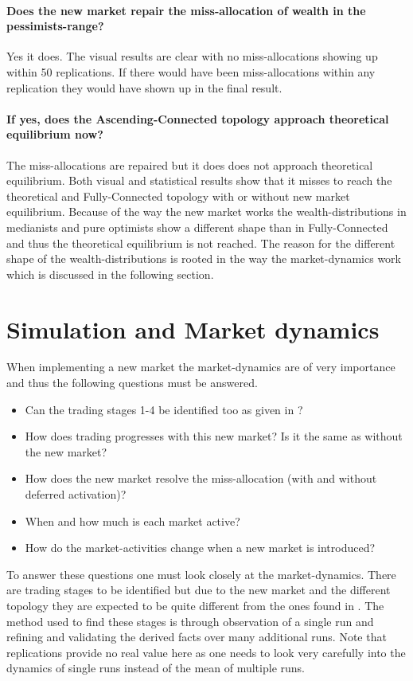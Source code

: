 \documentclass[Bachelorarbeit.tex]{subfiles}
\begin{document}
\paragraph{Does the new market repair the miss-allocation of wealth in the pessimists-range?}
Yes it does. The visual results are clear with no miss-allocations showing up within 50 replications. If there would have been miss-allocations within any replication they would have shown up in the final result.

\paragraph{If yes, does the Ascending-Connected topology approach theoretical equilibrium now?}
The miss-allocations are repaired but it does does not approach theoretical equilibrium. Both visual and statistical results show that it misses to reach the theoretical and Fully-Connected topology with or without new market equilibrium. Because of the way the new market works the wealth-distributions in medianists and pure optimists show a different shape than in Fully-Connected and thus the theoretical equilibrium is not reached. The reason for the different shape of the wealth-distributions is rooted in the way the market-dynamics work which is discussed in the following section.

\section{Simulation and Market dynamics}
When implementing a new market the market-dynamics are of very importance and thus the following questions must be answered.

\begin{itemize}
\item Can the trading stages 1-4 be identified too as given in \cite{Breuer2015}?
\item How does trading progresses with this new market? Is it the same as without the new market?
\item How does the new market resolve the miss-allocation (with and without deferred activation)?
\item When and how much is each market active? 
\item How do the market-activities change when a new market is introduced?
\end{itemize}

To answer these questions one must look closely at the market-dynamics. There are trading stages to be identified but due to the new market and the different topology they are expected to be quite different from the ones found in \cite{Breuer2015}. The method used to find these stages is through observation of a single run and refining and validating the derived facts over many additional runs. Note that replications provide no real value here as one needs to look very carefully into the dynamics of single runs instead of the mean of multiple runs.
\end{document}
